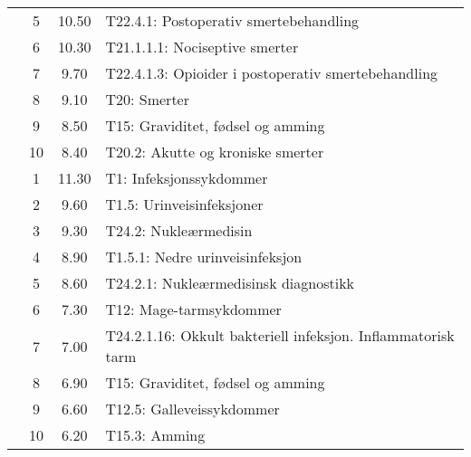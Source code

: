 \begin{table}[htbp]
\begin{tabular}{c c c l}
     & 5 & 10.50 & T22.4.1: Postoperativ smertebehandling \\
     & 6 & 10.30 & T21.1.1.1: Nociseptive smerter \\
     & 7 & 9.70 & T22.4.1.3: Opioider i postoperativ smertebehandling \\
     & 8 & 9.10 & T20: Smerter \\
     & 9 & 8.50 & T15: Graviditet, fødsel og amming \\
     & 10 & 8.40 & T20.2: Akutte og kroniske smerter \\
	\addlinespace
    8 & 1 & 11.30 & T1: Infeksjonssykdommer \\
     & 2 & 9.60 & T1.5: Urinveisinfeksjoner \\
     & 3 & 9.30 & T24.2: Nukleærmedisin \\
     & 4 & 8.90 & T1.5.1: Nedre urinveisinfeksjon \\
     & 5 & 8.60 & T24.2.1: Nukleærmedisinsk diagnostikk \\
     & 6 & 7.30 & T12: Mage-tarmsykdommer \\
     & 7 & 7.00 & T24.2.1.16: Okkult bakteriell infeksjon. Inflammatorisk tarm \\
     & 8 & 6.90 & T15: Graviditet, fødsel og amming \\
     & 9 & 6.60 & T12.5: Galleveissykdommer \\
     & 10 & 6.20 & T15.3: Amming \\
	\bottomrule
\end{tabular}
\end{table}

